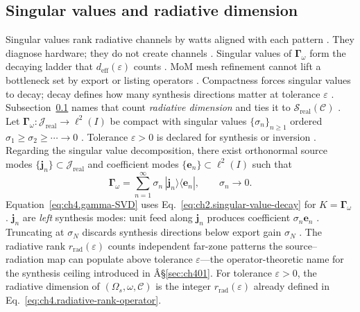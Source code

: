 \subsection{Singular values and radiative dimension}
\label{sec:ch434}
Singular values rank radiative channels by watts aligned with each pattern \cite{harrington2001}. They diagnose hardware; they do not create channels \cite{stratton1941}.
Singular values of $\boldsymbol{\Gamma}_\omega$ form the decaying ladder that $d_{\mathrm{eff}}(\varepsilon)$ counts \cite{hansen1988}. MoM mesh refinement cannot lift a bottleneck set by export or listing operators \cite{harrington2001}.
\medskip
Compactness forces singular values to decay; decay defines how many synthesis directions matter at tolerance
\(\varepsilon\) \cite{stratton1941}. Subsection~\ref{sec:ch434} names that count
\emph{radiative dimension} and ties it to \(\mathcal{S}_{\mathrm{real}}(\mathcal{C})\) \cite{hansen1988}.
Let \(\boldsymbol{\Gamma}_\omega:\mathcal{J}_{\mathrm{real}}\to\ell^{2}(I)\) be compact with singular values
\(\{\sigma_{n}\}_{n\ge1}\) ordered \(\sigma_{1}\ge\sigma_{2}\ge\cdots\to0\) \cite{stratton1941}.
Tolerance \(\varepsilon>0\) is declared for synthesis or inversion \cite{devaney2004}.
Regarding the singular value decomposition, there exist orthonormal source modes \(\{\mathbf{j}_{n}\}\subset\mathcal{J}_{\mathrm{real}}\) and coefficient modes
\(\{\mathbf{e}_{n}\}\subset\ell^{2}(I)\) such that
\begin{equation}
\label{eq:ch4.gamma-SVD}
\boldsymbol{\Gamma}_\omega
=
\sum_{n=1}^{\infty}\sigma_{n}\,
|\mathbf{j}_{n}\rangle\langle\mathbf{e}_{n}|,
\qquad
\sigma_{n}\to0.
\end{equation}
Equation~\eqref{eq:ch4.gamma-SVD} uses Eq.~\eqref{eq:ch2.singular-value-decay} for
\(K=\boldsymbol{\Gamma}_\omega\) \cite{stratton1941}. \(\mathbf{j}_{n}\) are
\emph{left} synthesis modes: unit feed along \(\mathbf{j}_{n}\) produces coefficient \(\sigma_{n}\mathbf{e}_{n}\)
\cite{harrington2001}. Truncating at \(\sigma_{N}\) discards synthesis directions below export gain
\(\sigma_{N}\) \cite{hansen1988}.
\label{def:ch4.radiative-rank}
The radiative rank $r_{\mathrm{rad}}(\varepsilon)$ counts independent far-zone patterns the source--radiation map can populate above tolerance $\varepsilon$---the operator-theoretic name for the synthesis ceiling introduced in Â§\ref{sec:ch401}. 
For tolerance \(\varepsilon>0\), the radiative dimension of \((\Omega_{s},\omega,\mathcal{C})\) is the integer $r_{\mathrm{rad}}(\varepsilon)$ already defined in Eq.~\eqref{eq:ch4.radiative-rank-operator}.

